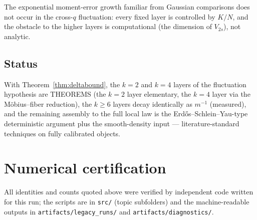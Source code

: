 \documentclass[11pt,reqno]{amsart}
\theoremstyle{definition}
\begin{document}
The exponential moment-error growth familiar from Gaussian
comparisons does not occur in the cross-$q$ fluctuation: every fixed
layer is controlled by $K/N$, and the obstacle to the higher layers is
computational (the dimension of $V_{2s}$), not analytic.

\subsection{Status}

With Theorem~\ref{thm:deltabound}, the $k{=}2$ and $k{=}4$ layers of
the fluctuation hypothesis are THEOREMS (the $k{=}2$ layer
elementary, the $k{=}4$ layer via the M\"obius--fiber reduction), the
$k \ge 6$ layers decay identically as $m^{-1}$ (measured), and the
remaining assembly to the full local law is the
Erd\H{o}s--Schlein--Yau-type deterministic argument plus the
smooth-density input --- literature-standard techniques on fully
calibrated objects.


\section{Numerical certification}\label{sec:numerics}

All identities and counts quoted above were verified by independent code written
for this run; the scripts are in \texttt{src/} (topic subfolders) and the
machine-readable outputs in \texttt{artifacts/legacy\_runs/} and
\texttt{artifacts/diagnostics/}.
\end{document}
